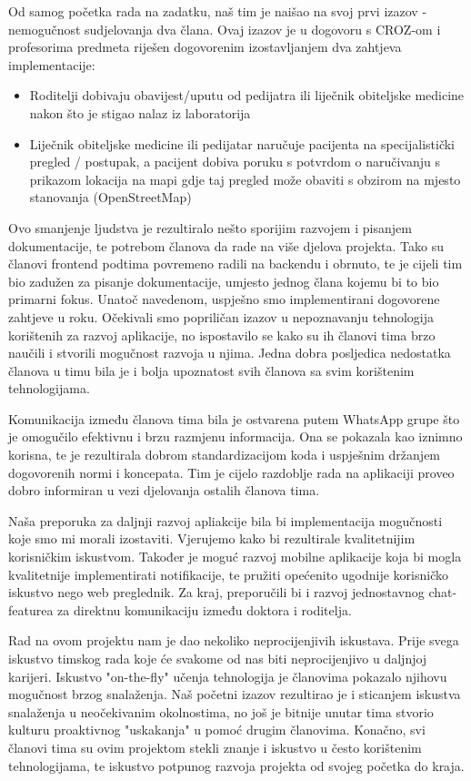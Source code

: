 			Od samog početka rada na zadatku, naš tim je naišao na svoj prvi izazov - nemogučnost sudjelovanja dva člana. Ovaj izazov je u dogovoru s CROZ-om i profesorima predmeta riješen dogovorenim izostavljanjem dva zahtjeva implementacije:
			\begin{itemize}
				\item Roditelji dobivaju obavijest/uputu od pedijatra ili liječnik obiteljske medicine nakon što je stigao nalaz iz laboratorija
				\item Liječnik obiteljske medicine ili pedijatar naručuje pacijenta na specijalistički pregled / postupak, a pacijent dobiva poruku s potvrdom o naručivanju s prikazom lokacija na mapi gdje taj pregled može obaviti s obzirom na mjesto stanovanja (OpenStreetMap)
			\end{itemize}
			Ovo smanjenje ljudstva je rezultiralo nešto sporijim razvojem i pisanjem dokumentacije, te potrebom članova da rade na više djelova projekta. Tako su članovi frontend podtima povremeno radili na backendu i obrnuto, te je cijeli tim bio zadužen za pisanje dokumentacije, umjesto jednog člana kojemu bi to bio primarni fokus.
			Unatoč navedenom, uspješno smo implementirani dogovorene zahtjeve u roku.
			Očekivali smo popriličan izazov u nepoznavanju tehnologija korištenih za razvoj aplikacije, no ispostavilo se kako su ih članovi tima brzo naučili i stvorili mogučnost razvoja u njima. Jedna dobra posljedica nedostatka članova u timu bila je i bolja upoznatost svih članova sa svim korištenim tehnologijama.
			
			Komunikacija između članova tima bila je ostvarena putem WhatsApp grupe što je omogučilo efektivnu i brzu razmjenu informacija.
			Ona se pokazala kao iznimno korisna, te je rezultirala dobrom standardizacijom koda i uspješnim držanjem dogovorenih normi i koncepata.
			Tim je cijelo razdoblje rada na aplikaciji proveo dobro informiran u vezi djelovanja ostalih članova tima.

			Naša preporuka za daljnji razvoj apliakcije bila bi implementacija mogučnosti koje smo mi morali izostaviti. Vjerujemo kako bi rezultirale kvalitetnijim korisničkim iskustvom.
			Također je moguć razvoj mobilne aplikacije koja bi mogla kvalitetnije implementirati notifikacije, te pružiti opećenito ugodnije korisničko iskustvo nego web preglednik.
			Za kraj, preporučili bi i razvoj jednostavnog chat-featurea za direktnu komunikaciju između doktora i roditelja.

			Rad na ovom projektu nam je dao nekoliko neprocijenjivih iskustava. Prije svega iskustvo timskog rada koje će svakome od nas biti neprocijenjivo u daljnjoj karijeri.
			Iskustvo "on-the-fly" učenja tehnologija je članovima pokazalo njihovu mogučnost brzog snalaženja. Naš početni izazov rezultirao je i sticanjem iskustva snalaženja u neočekivanim okolnostima, no još je bitnije unutar tima stvorio kulturu proaktivnog "uskakanja" u pomoć drugim članovima.
			Konačno, svi članovi tima su ovim projektom stekli znanje i iskustvo u često korištenim tehnologijama, te iskustvo potpunog razvoja projekta od svojeg početka do kraja.

		\eject 
